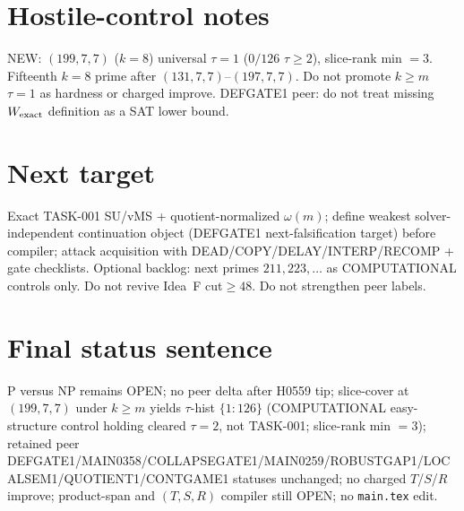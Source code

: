 \documentclass[11pt]{article}
\begin{document}
\section*{Hostile-control notes}
NEW: $(199,7,7)$ ($k{=}8$) universal $\tau{=}1$ ($0/126$ $\tau{\ge}2$), slice-rank min $=3$.
Fifteenth $k{=}8$ prime after $(131,7,7)$--$(197,7,7)$.
Do not promote $k{\ge}m$ $\tau{=}1$ as hardness or charged improve.
DEFGATE1 peer: do not treat missing $W_{\rm exact}$ definition as a SAT lower bound.

\section*{Next target}
Exact TASK-001 SU/vMS + quotient-normalized $\omega(m)$; define weakest solver-independent
continuation object (DEFGATE1 next-falsification target) before compiler;
attack acquisition with DEAD/COPY/DELAY/INTERP/RECOMP + gate checklists.
Optional backlog: next primes $211,223,\ldots$ as COMPUTATIONAL controls only.
Do not revive Idea~F cut$\ge48$. Do not strengthen peer labels.

\section*{Final status sentence}
P versus NP remains OPEN; no peer delta after H0559 tip; slice-cover at $(199,7,7)$ under $k{\ge}m$ yields $\tau$-hist $\{1{:}126\}$ (COMPUTATIONAL easy-structure control holding cleared $\tau{=}2$, not TASK-001; slice-rank min $=3$); retained peer DEFGATE1/MAIN0358/COLLAPSEGATE1/MAIN0259/ROBUSTGAP1/LOCALSEM1/QUOTIENT1/CONTGAME1 statuses unchanged; no charged $T$/$S$/$R$ improve; product-span and $(T,S,R)$ compiler still OPEN; no \texttt{main.tex} edit.
\end{document}
